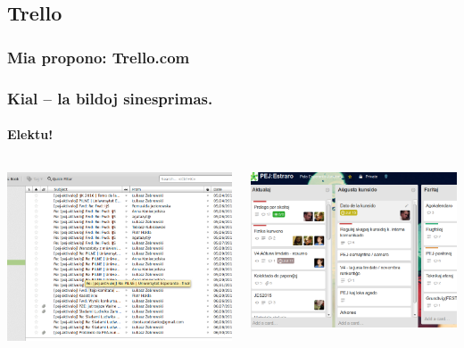 \documentclass{beamer}
\begin{document}
\subsection{Trello}
   
  \begin{frame}
    \frametitle{Mia propono: Trello.com}
    
    
  \end{frame}
  
  \begin{frame}
    \frametitle{Kial -- la bildoj sinesprimas.}
    \framesubtitle{Elektu!}
    
	\begin{columns}
	    \begin{center}
    		\includegraphics[scale=0.2]{ekranoj/retposhto}
    	\end{center}
    	\begin{center}
    	\includegraphics[scale=0.22]{ekranoj/trello-bonas-estraro}
    	\end{center}


\end{columns}
\end{frame}
\end{document}
